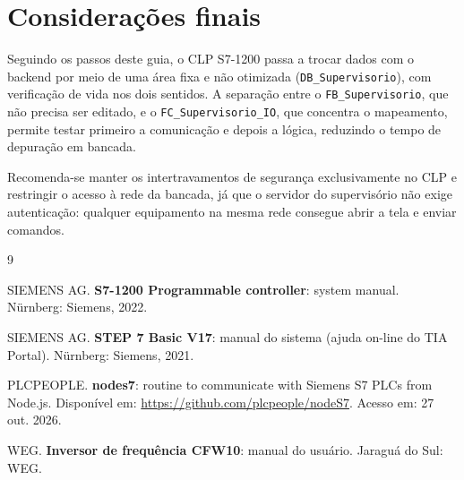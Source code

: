 \documentclass[12pt, oneside, a4paper, chapter=TITLE, section=TITLE, english, brazil]{abntex2}
\begin{document}
\chapter{Considerações finais}

Seguindo os passos deste guia, o CLP S7-1200 passa a trocar dados com o backend por meio de uma área fixa e não otimizada (\texttt{DB\_Supervisorio}), com verificação de vida nos dois sentidos. A separação entre o \texttt{FB\_Supervisorio}, que não precisa ser editado, e o \texttt{FC\_Supervisorio\_IO}, que concentra o mapeamento, permite testar primeiro a comunicação e depois a lógica, reduzindo o tempo de depuração em bancada.

Recomenda-se manter os intertravamentos de segurança exclusivamente no CLP e restringir o acesso à rede da bancada, já que o servidor do supervisório não exige autenticação: qualquer equipamento na mesma rede consegue abrir a tela e enviar comandos.

\postextual

\begin{thebibliography}{9}

SIEMENS AG. \textbf{S7-1200 Programmable controller}: system manual. Nürnberg: Siemens, 2022.

SIEMENS AG. \textbf{STEP 7 Basic V17}: manual do sistema (ajuda on-line do TIA Portal). Nürnberg: Siemens, 2021.

PLCPEOPLE. \textbf{nodes7}: routine to communicate with Siemens S7 PLCs from Node.js. Disponível em: \url{https://github.com/plcpeople/nodeS7}. Acesso em: 27 out. 2026.

WEG. \textbf{Inversor de frequência CFW10}: manual do usuário. Jaraguá do Sul: WEG.

\end{thebibliography}
\end{document}
